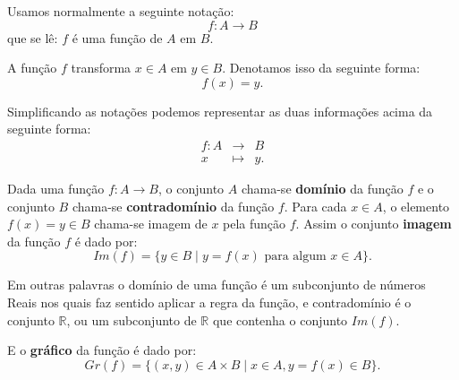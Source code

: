 \newpage

Usamos normalmente a seguinte notação:
\[f: A \rightarrow B\]
que se lê: $f$ é uma função de $A$ em $B$.

A função $f$ transforma $x \in A$ em $y \in B$. Denotamos isso da seguinte forma:
\[f(x) = y .\]

Simplificando as notações podemos representar as duas informações acima da seguinte forma:
\begin{eqnarray*}
 f: A & \rightarrow & B \\
 x & \mapsto & y.
\end{eqnarray*}

Dada uma função $f: A \rightarrow B$, o conjunto $A$ chama-se \textbf{domínio} da função $f$ e o conjunto $B$ chama-se \textbf{contradomínio} da função $f$.  Para cada $x \in A$, o elemento $f(x)= y \in B$ chama-se imagem de $x$ pela função $f$. Assim o conjunto \textbf{imagem} da função $f$ é dado por:
\[Im(f)= \{ y \in B \mid y = f(x) \text{ para algum } x \in A\} .\]

Em outras palavras o domínio de uma função é um subconjunto de números Reais nos quais faz sentido aplicar a regra da função, e contradomínio é o conjunto $\mathbb{R}$, ou um subconjunto de $\mathbb{R}$ que contenha o conjunto $Im(f)$.

E o \textbf{gráfico} da função é dado por:
\[Gr(f) = \{ (x, y) \in A \times B \mid x \in A, y = f(x) \in B\} .\]

